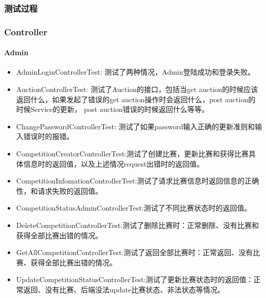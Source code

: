 \documentclass{article}
\begin{document}
				\subsubsection{测试过程}
					\subsubsection{Controller}
						\paragraph{Admin}
							\begin{itemize}
							\item AdminLoginControllerTest: 测试了两种情况，Admin登陆成功和登录失败。
							\item AuctionControllerTest: 测试了Auction的接口，包括当get auction的时候应该返回什么，如果发起了错误的get auction操作时会返回什么，post auction的时候Service的更新， post auction错误的时候返回什么等等。
							\item ChangePasswordControllerTest: 测试了如果password输入正确的更新准则和输入错误时的报错。
							\item CompetitionCreatorControllerTest:测试了创建比赛，更新比赛和获得比赛具体信息时的返回值，以及上述情况request出错时的返回值。
							\item CompetitionInfomationControllerTest:测试了请求比赛信息时返回信息的正确性，和请求失败的返回值。
							\item CompetitionStatusAdminControllerTest:测试了不同比赛状态时的返回值。
							\item DeleteCompetitionControllerTest:测试了删除比赛时：正常删除、没有比赛和获得全部比赛出错的情况。
							\item GetAllCompetitionControllerTest:测试了返回全部比赛时：正常返回、没有比赛、获得全部比赛出错的情况。
							\item UpdateCompetitionStatusControllerTest:测试了更新比赛状态时的返回值：正常返回、没有比赛、后端没法update比赛状态、非法状态等情况。
							\end{itemize}
\end{document}

